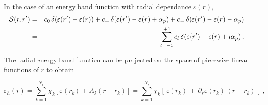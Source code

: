 \documentclass[11pt]{article}
\newcommand{\eps}{\varepsilon}
\newcommand{\cd}[1]{c_{#1}}
\newcommand{\alp}{\alpha_{p}}
\begin{document}




In the case of an energy band function with radial dependance $\varepsilon(r)$, 
\begin{eqnarray}
{\cal S}(r, r')  & = & 
\cd{0} \, \delta( \eps(r') - \eps(r) )  +  \cd{+} \, \delta( \eps(r') - \eps(r) + \alp) 
 + \cd{-} \, \delta( \eps(r') - \eps(r) - \alp) 
\nonumber \\
& = & \sum_{l=-1}^{+1} \cd{l} \, \delta( \eps(r') - \eps(r) + l \alp) \, .
\end{eqnarray}



%
%
%

The radial energy band function can be projected on the space of piecewise linear functions of $r$ to obtain

\begin{equation}
\eps_{h}(r) = \sum_{k=1}^{N_r} \chi_k  \left[ \eps(r_k) + A_k (r - r_k) \right] = \sum_{k=1}^{N_r} \chi_k  \left[ \, \eps(r_k) \,  +  \, \partial_{r}\eps(r_k) \, (r - r_k) \, \right] \, ,
 \end{equation}
\end{document}
